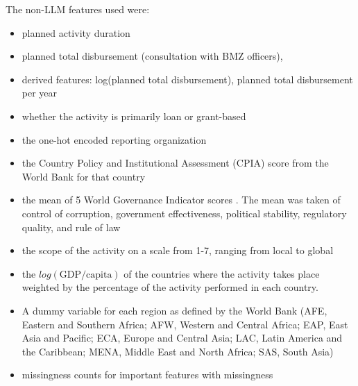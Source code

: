 \documentclass[12pt,a4paper]{article}
\let\citep\parencite
\begin{document}
The non-LLM features used were:
\begin{itemize}[noitemsep,topsep=0pt]
 \item planned activity duration \citep{goldembergMindingGapAid2025} %
 \item planned total disbursement (consultation with BMZ officers), \citep{bulmanGoodCountriesGood2017} \citep{goldembergMindingGapAid2025} \citep{ashtonPuzzleMissingPieces2023} \citep{eilersVolumeRiskComplexitya}
 \item derived features: log(planned total disbursement), planned total disbursement per year 
 \item whether the activity is primarily loan or grant-based \citep{bulmanGoodCountriesGood2017}
 \item the one-hot encoded reporting organization \citep{goldembergMindingGapAid2025} %
 \item the Country Policy and Institutional Assessment (CPIA) score from the World Bank for that country \citep{bulmanGoodCountriesGood2017} 
 \item the mean of 5 World Governance Indicator scores \citep{kaufmannWorldwideGovernanceIndicators2024}. The mean was taken of control of corruption, government effectiveness, political stability, regulatory quality, and rule of law \citep{goldembergMindingGapAid2025} \citep{ndikumanaImpactForeignAid2017}
 \item the scope of the activity on a scale from 1-7, ranging from local to global \citep{vivaltHowMuchCan2020}
 \item the $log(\text{GDP} / \text{capita})$ of the countries where the activity takes place weighted by the percentage of the activity performed in each country. \citep{goldembergMindingGapAid2025} \citep{bulmanGoodCountriesGood2017}
\item A dummy variable for each region as defined by the World Bank (AFE, Eastern and Southern Africa; AFW, Western and Central Africa; EAP, East Asia and Pacific; ECA, Europe and Central Asia; LAC, Latin America and the Caribbean; MENA, Middle East and North Africa; SAS, South Asia) \citep{goldembergMindingGapAid2025} \citep{vivaltHowMuchCan2020}
\item  missingness counts for important features with missingness
\end{itemize}
\end{document}
